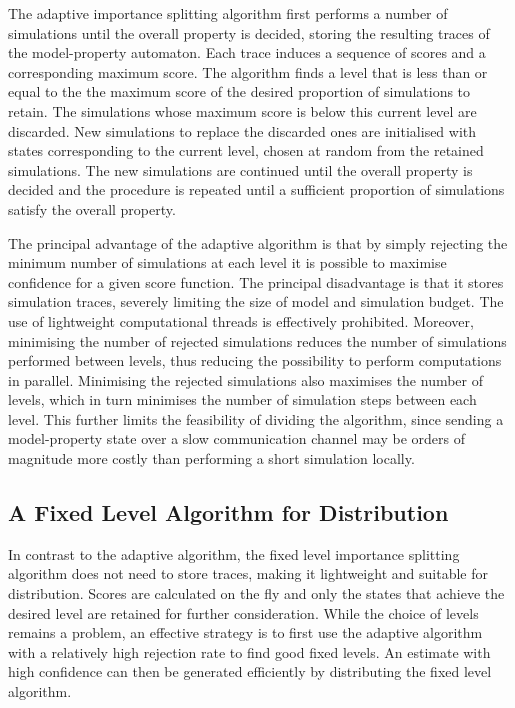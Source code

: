 \documentclass{llncs}
\begin{document}
The adaptive importance splitting algorithm first performs a number
of simulations until the overall property is decided, storing the
resulting traces of the model-property automaton. Each trace induces
a sequence of scores and a corresponding maximum score. The algorithm
finds a level that is less than or equal to the the maximum score
of the desired proportion of simulations to retain. The simulations
whose maximum score is below this current level are discarded. New
simulations to replace the discarded ones are initialised with states
corresponding to the current level, chosen at random from the retained
simulations. The new simulations are continued until the overall property
is decided and the procedure is repeated until a sufficient proportion
of simulations satisfy the overall property.

The principal advantage of the adaptive algorithm is that by simply
rejecting the minimum number of simulations at each level it is possible
to maximise confidence for a given score function. The principal disadvantage
is that it stores simulation traces, severely limiting the size of
model and simulation budget. The use of lightweight computational
threads is effectively prohibited. Moreover, minimising the number
of rejected simulations reduces the number of simulations performed
between levels, thus reducing the possibility to perform computations
in parallel. Minimising the rejected simulations also maximises the
number of levels, which in turn minimises the number of simulation
steps between each level. This further limits the feasibility of dividing
the algorithm, since sending a model-property state over a slow communication
channel may be orders of magnitude more costly than performing a short
simulation locally.


\subsection{A Fixed Level Algorithm for Distribution\label{sec:fixed}}

In contrast to the adaptive algorithm, the fixed level importance
splitting algorithm does not need to store traces, making it lightweight
and suitable for distribution. Scores are calculated on the fly and
only the states that achieve the desired level are retained for further
consideration. While the choice of levels remains a problem, an effective
strategy is to first use the adaptive algorithm with a relatively
high rejection rate to find good fixed levels. An estimate with high
confidence can then be generated efficiently by distributing the fixed
level algorithm.
\end{document}
